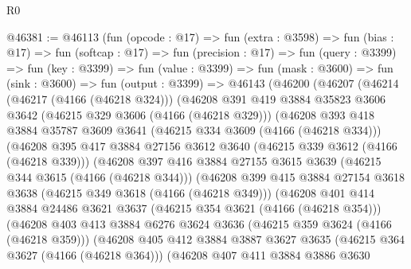 \begin{lexlean}{R0}
\begin{coremodule}
@46381 := @46113
    (fun (opcode : @17) =>
    fun (extra : @3598) =>
    fun (bias : @17) =>
    fun (softcap : @17) =>
    fun (precision : @17) =>
    fun (query : @3399) =>
    fun (key : @3399) =>
    fun (value : @3399) =>
    fun (mask : @3600) =>
    fun (sink : @3600) =>
    fun (output : @3399) =>
    @46143
      (@46200
        (@46207
          (@46214
            (@46217 (@4166 (@46218 @324)))
            (@46208
              @391
              @419
              @3884
              @35823
              @3606
              @3642
              (@46215 @329 @3606 (@4166 (@46218 @329)))
              (@46208
                @393
                @418
                @3884
                @35787
                @3609
                @3641
                (@46215 @334 @3609 (@4166 (@46218 @334)))
                (@46208
                  @395
                  @417
                  @3884
                  @27156
                  @3612
                  @3640
                  (@46215 @339 @3612 (@4166 (@46218 @339)))
                  (@46208
                    @397
                    @416
                    @3884
                    @27155
                    @3615
                    @3639
                    (@46215 @344 @3615 (@4166 (@46218 @344)))
                    (@46208
                      @399
                      @415
                      @3884
                      @27154
                      @3618
                      @3638
                      (@46215 @349 @3618 (@4166 (@46218 @349)))
                      (@46208
                        @401
                        @414
                        @3884
                        @24486
                        @3621
                        @3637
                        (@46215 @354 @3621 (@4166 (@46218 @354)))
                        (@46208
                          @403
                          @413
                          @3884
                          @6276
                          @3624
                          @3636
                          (@46215 @359 @3624 (@4166 (@46218 @359)))
                          (@46208
                            @405
                            @412
                            @3884
                            @3887
                            @3627
                            @3635
                            (@46215 @364 @3627 (@4166 (@46218 @364)))
                            (@46208
                              @407
                              @411
                              @3884
                              @3886
                              @3630

\end{coremodule}
\end{lexlean}

